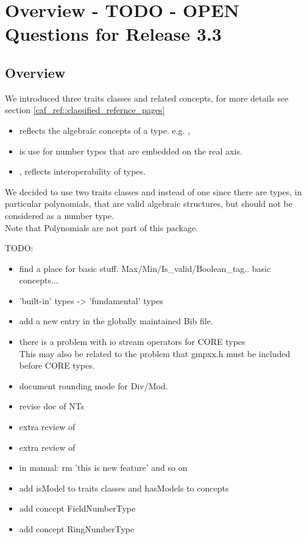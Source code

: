 \section{Overview - TODO - OPEN Questions for Release 3.3}

\subsection{Overview}

We introduced three traits classes and related concepts, for more details see 
section \ref{caf_ref::classified_refernce_pages}
\begin{itemize}
\item {} reflects the algebraic concepts of a 
      type. e.g. , 
\item {} is use for number types that are embedded on 
      the real axis. 
\item {}, reflects interoperability of types. 
\end{itemize}

We decided to use two traits classes  
and  instead of one  since there are 
types, in particular polynomials, that are valid algebraic structures, 
but should not be considered as a number type.\\
Note that Polynomials are not part of this package. 

TODO:
\begin{itemize}
\item find a place for basic stuff. Max/Min/Is\_valid/Boolean\_tag..
      basic concepts...
\item 'built-in' types -> 'fundamental' types 
\item add a new entry in the globally maintained Bib file.
\item there is a problem with io stream operators for CORE types \\
      This may also be related to the problem that gmpxx.h must be included 
      before CORE types. 
\item document rounding mode for Div/Mod. 
\item revise doc of NTs
\item extra review of 
\item extra review of 
\item in manual: rm 'this is new feature' and so on
\item add isModel to traits classes and hasModels to concepts 
\item add concept FieldNumberType
\item add concept RingNumberType 
\end{itemize}

